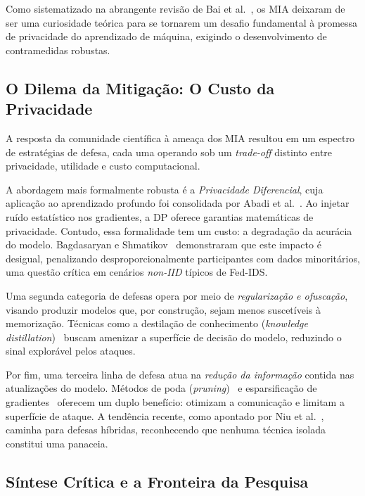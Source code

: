 \documentclass[
	12pt,				%
	openright,			%
	oneside,			%
	a4paper,			%
	english,			%
	french,				%
	spanish,			%
	brazil,				%
	]{abntex2}
\begin{document}
Como sistematizado na abrangente revisão de Bai et al.~\cite{bai2024survey}, os MIA deixaram de ser uma curiosidade teórica para se tornarem um desafio fundamental à promessa de privacidade do aprendizado de máquina, exigindo o desenvolvimento de contramedidas robustas.

\subsection{O Dilema da Mitigação: O Custo da Privacidade}

A resposta da comunidade científica à ameaça dos MIA resultou em um espectro de estratégias de defesa, cada uma operando sob um \textit{trade-off} distinto entre privacidade, utilidade e custo computacional.

A abordagem mais formalmente robusta é a \textit{Privacidade Diferencial}, cuja aplicação ao aprendizado profundo foi consolidada por Abadi et al.~\cite{abadi2016dpsgd}. Ao injetar ruído estatístico nos gradientes, a DP oferece garantias matemáticas de privacidade. Contudo, essa formalidade tem um custo: a degradação da acurácia do modelo. Bagdasaryan e Shmatikov~\cite{bagdasaryan2019dpimpact} demonstraram que este impacto é desigual, penalizando desproporcionalmente participantes com dados minoritários, uma questão crítica em cenários \textit{non-IID} típicos de Fed-IDS.

Uma segunda categoria de defesas opera por meio de \textit{regularização e ofuscação}, visando produzir modelos que, por construção, sejam menos suscetíveis à memorização. Técnicas como a destilação de conhecimento (\textit{knowledge distillation})~\cite{mazzone2022kdmask} buscam amenizar a superfície de decisão do modelo, reduzindo o sinal explorável pelos ataques.

Por fim, uma terceira linha de defesa atua na \textit{redução da informação} contida nas atualizações do modelo. Métodos de poda (\textit{pruning})~\cite{wu2023pruningfl} e esparsificação de gradientes~\cite{wei2024gradientsparsification} oferecem um duplo benefício: otimizam a comunicação e limitam a superfície de ataque. A tendência recente, como apontado por Niu et al.~\cite{niu2025dualdefense}, caminha para defesas híbridas, reconhecendo que nenhuma técnica isolada constitui uma panaceia.

\subsection{Síntese Crítica e a Fronteira da Pesquisa}
\end{document}
